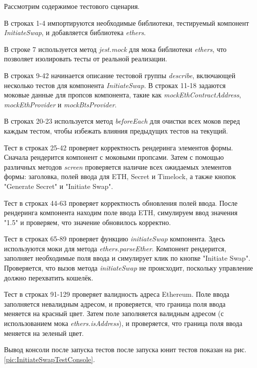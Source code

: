 Рассмотрим содержимое тестового сценария.

В строках 1-4 импортируются необходимые библиотеки, тестируемый компонент \textit{InitiateSwap}, и добавляется библиотека \textit{ethers}.

В строке 7 используется метод \textit{jest.mock} для мока библиотеки \textit{ethers}, что позволяет изолировать тесты от реальной реализации.

В строках 9-42 начинается описание тестовой группы \textit{describe}, включающей несколько тестов для компонента \textit{InitiateSwap}. В строках 11-18 задаются моковые данные для пропсов компонента, такие как \textit{mockEthContractAddress}, \textit{mockEthProvider} и \textit{mockBtsProvider}.

В строках 20-23 используется метод \textit{beforeEach} для очистки всех моков перед каждым тестом, чтобы избежать влияния предыдущих тестов на текущий.

Тест в строках 25-42 проверяет корректность рендеринга элементов формы. Сначала рендерится компонент с моковыми пропсами. Затем с помощью различных методов \textit{screen} проверяется наличие всех ожидаемых элементов формы: заголовка, полей ввода для ETH, Secret и Timelock, а также кнопок "Generate Secret" и "Initiate Swap".

Тест в строках 44-63 проверяет корректность обновления полей ввода. После рендеринга компонента находим поле ввода ETH, симулируем ввод значения "1.5" и проверяем, что значение обновилось корректно.

Тест в строках 65-89 проверяет функцию \textit{initiateSwap} компонента. Здесь используются моки для метода \textit{ethers.parseEther}. Компонент рендерится, заполняет необходимые поля ввода и симулирует клик по кнопке "Initiate Swap". Проверяется, что вызов метода \textit{initiateSwap} не происходит, поскольку управление должно перехватить кошелёк.

Тест в строках 91-129 проверяет валидность адреса Ethereum. Поле ввода заполняется невалидным адресом, и проверяется, что граница поля ввода меняется на красный цвет. Затем поле заполняется валидным адресом (с использованием мока \textit{ethers.isAddress}), и проверяется, что граница поля ввода меняется на зеленый цвет.

Вывод консоли после запуска тестов после запуска юнит тестов показан на рис. \ref{pic:InitiateSwapTestConsole}.

